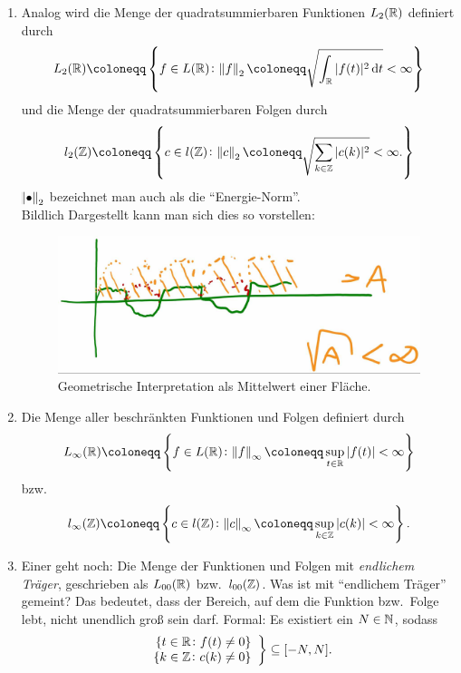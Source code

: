 \begin{definition}[Funktionenräume]
\begin{enumerate}
\item Analog wird die Menge der quadratsummierbaren Funktionen $ L_{2}(\mathbb{R}) $ definiert durch
\[ 
  L_{2}(\R) \coloneqq \left\{
    f \in L(\R) \colon \norm{f}_{2} \coloneqq \sqrt{ \int_{\R} |f(t)|^{2} \dif t } < \infty
  \right\}
\]
und die Menge der quadratsummierbaren Folgen durch
\[ 
  l_{2}(\Z) \coloneqq \left\{
    c \in l(\Z) \colon \norm{c}_{2} \coloneqq \sqrt{ \sum_{k \in \Z} |c(k)|^{2} } < \infty.
  \right\}
\]
$ \norm{\bullet}_{2} $ bezeichnet man auch als die \enquote{Energie-Norm}.\\
Bildlich Dargestellt kann man sich dies so vorstellen:
\begin{figure}[h]
	\centering
	\includegraphics[width=0.5\linewidth]{Bilder/L2}
	\caption{Geometrische Interpretation als Mittelwert einer Fläche.}
	\label{fig:L2}
\end{figure}
\item Die Menge aller beschränkten Funktionen und Folgen definiert durch
\[
  L_{\infty}(\R) \coloneqq \left\{
    f \in L(\R) \colon \norm{f}_{\infty} \coloneqq
      \sup_{t \in \R} |f(t)| < \infty
  \right\}
\]
bzw.
\[
  l_{\infty}(\Z) \coloneqq \left\{
    c \in l(\Z) \colon \norm{c}_{\infty} \coloneqq
      \sup_{k \in \Z} |c(k)| < \infty
  \right\}.
\]
\item Einer geht noch: Die Menge der Funktionen und Folgen mit \emph{endlichem Träger}, geschrieben
als $ L_{00}(\mathbb{R}) $ bzw.\ $ l_{00}(\mathbb{Z}) $. Was ist mit \enquote{endlichem Träger} gemeint? Das 
bedeutet, dass der Bereich, auf dem die Funktion bzw.\ Folge lebt, nicht unendlich groß sein darf.
Formal: Es existiert ein $ N \in \mathbb{N} $, sodass
\[
  \left.
  \begin{array}{r}
    \{ t \in \mathbb{R} \colon f(t) \neq 0 \} \\
    \{ k \in \mathbb{Z} \colon c(k) \neq 0 \}
  \end{array}
  \right\}
  \subseteq [-N, N].
\]
\end{enumerate}
\end{definition}


